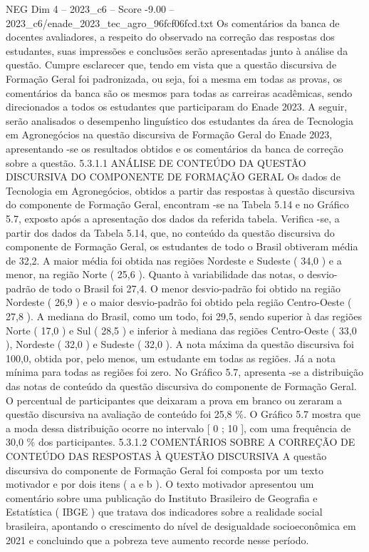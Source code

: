 \begin{textsample}{NEG Dim 4 – 2023\_c6 – Score -9.00 – 2023\_c6/enade\_2023\_tec\_agro\_96fcf06fcd.txt}
Os comentários da banca de docentes avaliadores, a respeito do observado na correção das respostas dos estudantes, suas impressões e conclusões serão apresentadas junto à análise da questão.
Cumpre esclarecer que, tendo em vista que a questão discursiva de Formação Geral foi padronizada, ou seja, foi a mesma em todas as provas, os comentários da banca são os mesmos para todas as carreiras acadêmicas, sendo direcionados a todos os estudantes que participaram do Enade 2023.
A seguir, serão analisados o desempenho linguístico dos estudantes da área de Tecnologia em Agronegócios na questão discursiva de Formação Geral do Enade 2023, apresentando -se os resultados obtidos e os comentários da banca de correção sobre a questão. 5.3.1.1 ANÁLISE DE CONTEÚDO DA QUESTÃO DISCURSIVA DO COMPONENTE DE FORMAÇÃO GERAL Os dados de Tecnologia em Agronegócios, obtidos a partir das respostas à questão discursiva do componente de Formação Geral, encontram -se na Tabela 5.14 e no Gráfico 5.7, exposto após a apresentação dos dados da referida tabela.
Verifica -se, a partir dos dados da Tabela 5.14, que, no conteúdo da questão discursiva do componente de Formação Geral, os estudantes de todo o Brasil obtiveram média de 32,2.
A maior média foi obtida nas regiões Nordeste e Sudeste ( 34,0 ) e a menor, na região Norte ( 25,6 ).
Quanto à variabilidade das notas, o desvio-padrão de todo o Brasil foi 27,4.
O menor desvio-padrão foi obtido na região Nordeste ( 26,9 ) e o maior desvio-padrão foi obtido pela região Centro-Oeste ( 27,8 ).
A mediana do Brasil, como um todo, foi 29,5, sendo superior à das regiões Norte ( 17,0 ) e Sul ( 28,5 ) e inferior à mediana das regiões Centro-Oeste ( 33,0 ), Nordeste ( 32,0 ) e Sudeste ( 32,0 ).
A nota máxima da questão discursiva foi 100,0, obtida por, pelo menos, um estudante em todas as regiões.
Já a nota mínima para todas as regiões foi zero.
No Gráfico 5.7, apresenta -se a distribuição das notas de conteúdo da questão discursiva do componente de Formação Geral.
O percentual de participantes que deixaram a prova em branco ou zeraram a questão discursiva na avaliação de conteúdo foi 25,8 \%.
O Gráfico 5.7 mostra que a moda dessa distribuição ocorre no intervalo [ 0 ; 10 ], com uma frequência de 30,0 \% dos participantes. 5.3.1.2 COMENTÁRIOS SOBRE A CORREÇÃO DE CONTEÚDO DAS RESPOSTAS À QUESTÃO DISCURSIVA A questão discursiva do componente de Formação Geral foi composta por um texto motivador e por dois itens ( a e b ).
O texto motivador apresentou um comentário sobre uma publicação do Instituto Brasileiro de Geografia e Estatística ( IBGE ) que tratava dos indicadores sobre a realidade social brasileira, apontando o crescimento do nível de desigualdade socioeconômica em 2021 e concluindo que a pobreza teve aumento recorde nesse período.

\end{textsample}
